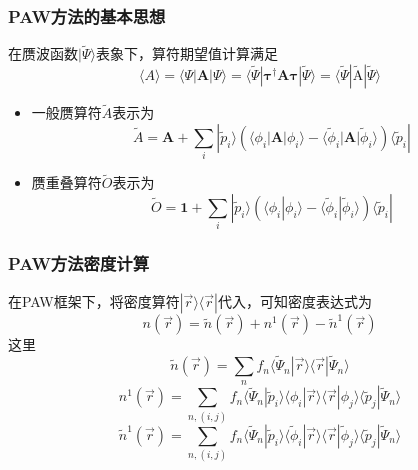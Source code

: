\documentclass[cjk,slidestop,compress,mathserif,blue]{beamer}
\begin{document}
\frame
{
\frametitle{\textrm{PAW}方法的基本思想}
	在赝波函数$|\tilde\Psi\rangle$表象下，算符期望值计算满足$$\langle A \rangle=\langle\Psi|\mathbf{A}|\Psi\rangle=\langle\tilde\Psi|\mathbf{\tau}^{\dag}\mathbf{A}\mathbf{\tau}|\tilde\Psi\rangle=\langle\tilde\Psi|\tilde{\mathrm{A}}|\tilde\Psi\rangle$$
\begin{itemize}
	\item 一般赝算符$\tilde A$表示为
		$$\tilde A=\mathbf{A}+\sum_i|\tilde p_i\rangle(\langle\phi_i|\mathbf{A}|\phi_i\rangle-\langle\tilde\phi_i|\mathbf{A}|\tilde\phi_i\rangle)\langle\tilde p_i|$$
	\item 赝重叠算符$\tilde O$表示为
		$$\tilde O=\mathbf{1}+\sum_i|\tilde p_i\rangle(\langle\phi_i|\phi_i\rangle-\langle\tilde\phi_i|\tilde\phi_i\rangle)\langle\tilde p_i|$$
\end{itemize}
}

\frame
{
\frametitle{\textrm{PAW}方法密度计算}
在\textrm{PAW}框架下，将密度算符$|\vec r\rangle\langle\vec r|$代入，可知密度表达式为
$$n(\vec r)=\tilde n(\vec r)+n^1(\vec r)-\tilde n^1(\vec r)$$
这里
$$\tilde n(\vec r)=\sum_nf_n\langle\tilde\Psi_n|\vec r\rangle\langle\vec r|\tilde\Psi_n\rangle$$ 
$$n^1(\vec r)=\sum_{n,(i,j)}f_n\langle\tilde\Psi_n|\tilde p_i\rangle\langle\phi_i|\vec r\rangle\langle\vec r|\phi_j\rangle\langle\tilde p_j|\tilde\Psi_n\rangle$$
$$\tilde n^1(\vec r)=\sum_{n,(i,j)}f_n\langle\tilde\Psi_n|\tilde p_i\rangle\langle\tilde\phi_i|\vec r\rangle\langle\vec r|\tilde\phi_j\rangle\langle\tilde p_j|\tilde\Psi_n\rangle$$
}
\end{document}
